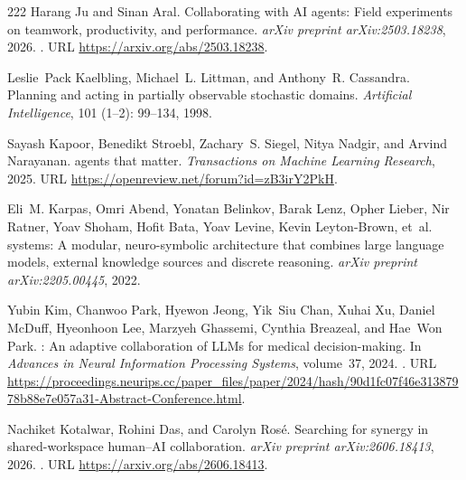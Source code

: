 \begin{thebibliography}{222}
Harang Ju and Sinan Aral.
\newblock Collaborating with {AI} agents: Field experiments on teamwork,
  productivity, and performance.
\newblock \emph{arXiv preprint arXiv:2503.18238}, 2026.
\newblock {}.
\newblock URL \url{https://arxiv.org/abs/2503.18238}.

Leslie~Pack Kaelbling, Michael~L. Littman, and Anthony~R. Cassandra.
\newblock Planning and acting in partially observable stochastic domains.
\newblock \emph{Artificial Intelligence}, 101 (1--2):
  99--134, 1998.

Sayash Kapoor, Benedikt Stroebl, Zachary~S. Siegel, Nitya Nadgir, and Arvind
  Narayanan.
 agents that matter.
\newblock \emph{Transactions on Machine Learning Research}, 2025.
\newblock URL \url{https://openreview.net/forum?id=zB3irY2PkH}.

Eli~M. Karpas, Omri Abend, Yonatan Belinkov, Barak Lenz, Opher Lieber, Nir
  Ratner, Yoav Shoham, Hofit Bata, Yoav Levine, Kevin Leyton-Brown, et~al.
 systems: A modular, neuro-symbolic architecture that combines
  large language models, external knowledge sources and discrete reasoning.
\newblock \emph{arXiv preprint arXiv:2205.00445}, 2022.

Yubin Kim, Chanwoo Park, Hyewon Jeong, Yik~Siu Chan, Xuhai Xu, Daniel McDuff,
  Hyeonhoon Lee, Marzyeh Ghassemi, Cynthia Breazeal, and Hae~Won Park.
: An adaptive collaboration of {LLM}s for medical
  decision-making.
\newblock In \emph{Advances in Neural Information Processing Systems},
  volume~37, 2024.
\newblock {}.
\newblock URL
  \url{https://proceedings.neurips.cc/paper_files/paper/2024/hash/90d1fc07f46e31387978b88e7e057a31-Abstract-Conference.html}.

Nachiket Kotalwar, Rohini Das, and Carolyn Ros{\'e}.
\newblock Searching for synergy in shared-workspace human--{AI} collaboration.
\newblock \emph{arXiv preprint arXiv:2606.18413}, 2026.
\newblock {}.
\newblock URL \url{https://arxiv.org/abs/2606.18413}.


\end{thebibliography}
